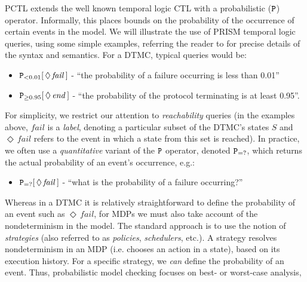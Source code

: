 \documentclass{llncs}
\begin{document}
PCTL extends the well known temporal logic CTL  with a probabilistic ($\tt P$) operator.
Informally, this places bounds on the probability of the occurrence of certain events in the model.
We will illustrate the use of PRISM temporal logic queries, using some simple examples,
referring the reader to \cite{HJ94,KNP07a} for precise details of the syntax and semantics.
For a DTMC, typical queries would be:
\vspace{-5pt}
\begin{itemize}
\item ${\tt P}_{<0.01}[\,\Diamond\,\mathit{fail}\,]$ -
``the probability of a failure occurring is less than 0.01''
\item ${\tt P}_{\geq 0.95}[\,\Diamond\,\mathit{end}\,]$ -
``the probability of the protocol terminating is at least 0.95''.
\end{itemize}
\vspace{-5pt}
For simplicity, we restrict our attention to \emph{reachability} queries
(in the examples above, $\mathit{fail}$ is a \emph{label}, denoting a particular subset of the DTMC's states $S$
and $\Diamond\,\mathit{fail}$ refers to the event in which a state from this set is reached).
%
In practice, we often use a \emph{quantitative} variant of the ${\tt P}$ operator,
denoted ${\tt P}_{=?}$, which returns the actual probability of an event's occurrence, e.g.:
\vspace{-5pt}
\begin{itemize}
\item ${\tt P}_{=?}[\,\Diamond\,\mathit{fail}\,]$ -
``what is the probability of a failure occurring?''
\end{itemize}
\vspace{-5pt}
Whereas in a DTMC it is relatively straightforward to define the probability
of an event such as $\Diamond\,\mathit{fail}$,
for MDPs we must also take account of the nondeterminism in the model.
The standard approach is to use the notion of
\emph{strategies} (also referred to as \emph{policies}, \emph{schedulers}, etc.).
A strategy resolves nondeterminism in an MDP (i.e. chooses an action in a state),
based on its execution history. %
For a specific strategy, we \emph{can} define the probability of an event.
Thus, probabilistic model checking focuses on best- or worst-case analysis,
\end{document}
